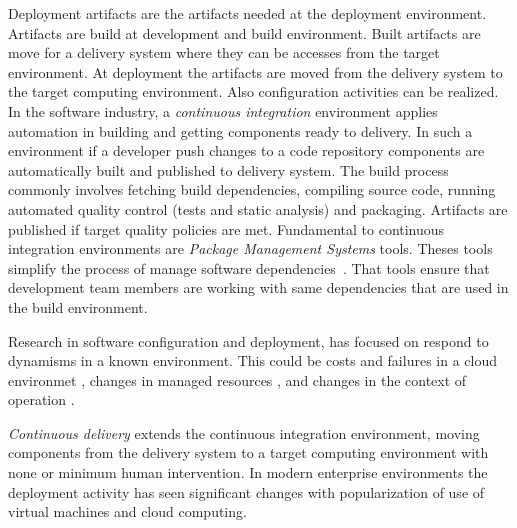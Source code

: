 Deployment artifacts are the artifacts needed at the deployment environment. Artifacts are build at development and build environment. Built artifacts are move for a delivery system where they can be accesses from the target environment. At deployment the artifacts are moved from the delivery system to the target computing environment. Also configuration activities can be realized.
In the software industry, a \emph{continuous integration} environment applies automation in building and getting components ready to delivery. In such a environment if a developer push changes to a code repository components are automatically built and published to delivery system. The build process commonly involves fetching build dependencies, compiling source code, running automated quality control (tests and static analysis) and packaging. Artifacts are published if target quality policies are met.
Fundamental to continuous integration environments are \emph{Package Management Systems} tools. Theses tools simplify the process of manage software dependencies~\cite{spinellis_package_2012}. That tools ensure that development team members are working with same dependencies that are used in the build environment.

Research in software configuration and deployment, has focused on respond to dynamisms in a known environment. This could be costs and failures in a cloud environmet \cite{ferreira_leite_user_2014}, changes in managed resources \citep{gunalp_rondo_2015}, and changes in the context of operation \cite{bencomo_dynamically_2008}.

\emph{Continuous delivery} extends the continuous integration environment, moving components from the delivery system to a target computing environment with none or minimum human intervention.
In modern enterprise environments the deployment activity has seen significant changes with popularization of use of virtual machines and cloud computing.

